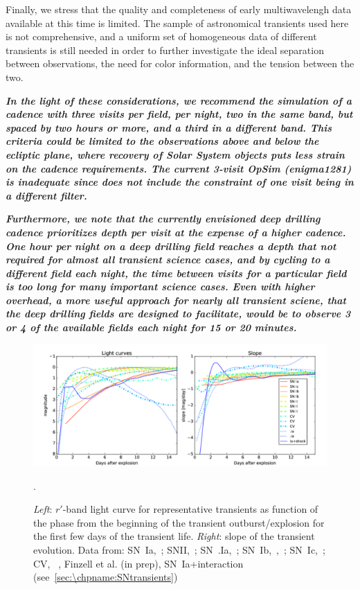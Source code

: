 Finally, we stress that the quality and completeness of early
multiwavelengh data available at this time is limited. The sample of
astronomical transients used here is not comprehensive, and a uniform
set of homogeneous data of different transients is still needed in
order to further investigate the ideal separation between
observations, the need for color information, and the tension between
the two.

{\bf\emph{In the light of these considerations, we recommend the
    simulation of a cadence with three visits per field, per night,
    two in the same band, but spaced by two hours or more, and a third
    in a different band. This criteria could be limited to the
    observations above and below the ecliptic plane, where recovery of
    Solar System objects puts less strain on the cadence requirements. 
    The current 3-visit OpSim (enigma1281) is inadequate since does not 
    include the constraint of one visit being in a different filter.}}

{\bf\emph{Furthermore, we note that the currently envisioned
    deep drilling cadence prioritizes depth per visit at the expense
    of a higher cadence. One hour per night on a deep drilling field
    reaches a depth that not required for almost all transient science
    cases, and by cycling to a different field each night, the time
    between visits for a particular field is too long for many
    important science cases. Even with higher overhead, a more useful
    approach for nearly all transient sciene, that the deep drilling
    fields are designed to facilitate, would be to observe 3 or 4 of
    the available fields each night for 15 or 20 minutes.}}

\begin{figure}[hbt]
\centerline{
\includegraphics[width=\textwidth]{figs/transients/earlyslope1.pdf}
}
\caption{\emph{Left}: $r'$-band light curve for representative transients as function of the phase from the beginning of the transient outburst/explosion for the first few days of the transient life. \emph{Right}: slope of the transient evolution. Data from: SN~Ia,~\citet{Olling15}; SNII,~\citet{Rubin16}; SN~.Ia,~\citet{Shen10}; SN~Ib,~\citet{Valenti11},~\citet{Cao13}; SN~Ic,~\citet{Mazzali02}; CV, ~\citet{Sokoloski13}, Finzell et al. (in prep), SN~Ia+interaction (see~\autoref{sec:\chpname:SNtransients})}.
\label{fig:earlyslope}
\end{figure}

